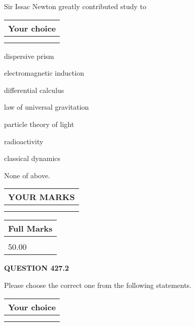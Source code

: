 \documentclass[12pt]{article}
\begin{document}
  
Sir Issac Newton greatly contributed study to
  
  
\noindent\hspace{3.0in} \begin{tabular}{|l|}
\hline
Your choice \\
\hline
 \\ 
 \\ 
\hline
\end{tabular}
  
  
 
 
dispersive prism
 
 
electromagnetic induction
 
 
differential calculus
 
 
law of universal gravitation
 
 
particle theory of light
 
 
radioactivity
 
 
classical dynamics
 
 
 None of above.
 
 
  
\vspace{0.2in}
  
\noindent\begin{tabular}{|l|}
\hline
 YOUR MARKS  \\
\hline
 \\ 
 \\ 
\hline
\end{tabular}
\hspace{0.05in} \begin{tabular}{|l|}
\hline
 Full Marks  \\
\hline
 \\ 
50.00 \\
\hline
\end{tabular}
{\textbf{\Large{QUESTION
427.2 
}}}
  
  
Please choose the correct one from the following statements.
  
  
\noindent\hspace{3.0in} \begin{tabular}{|l|}
\hline
Your choice \\
\hline
 \\ 
 \\ 
\hline
\end{tabular}
  
\end{document}
